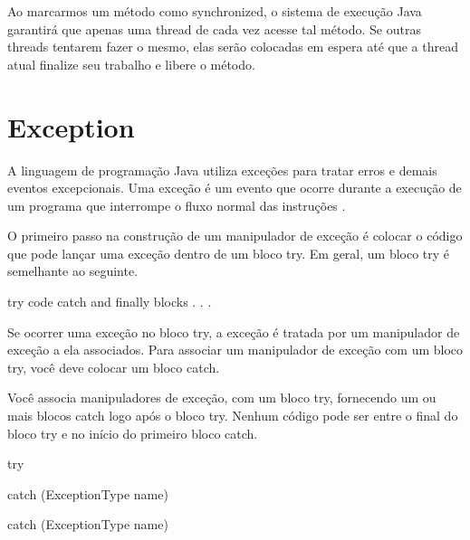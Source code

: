Ao marcarmos um método como synchronized, o sistema de execução Java garantirá que apenas uma thread de cada vez acesse tal método. Se outras threads tentarem fazer o mesmo, elas serão colocadas em espera até que a thread atual finalize seu trabalho e libere o método.

\section{Exception}

A linguagem de programação Java utiliza exceções para tratar erros e demais eventos excepcionais. Uma exceção é um evento que ocorre durante a execução de um programa que interrompe o fluxo normal das instruções \cite{except}.

O primeiro passo na construção de um manipulador de exceção é colocar o código que pode lançar uma exceção dentro de um bloco try. Em geral, um bloco try é semelhante ao seguinte.

try {
    code
}
catch and finally blocks . . .

Se ocorrer uma exceção no bloco try, a exceção é tratada por um manipulador de exceção a ela associados. Para associar um manipulador de exceção com um bloco try, você deve colocar um bloco catch.

Você associa manipuladores de exceção, com um bloco try, fornecendo um ou mais blocos catch logo após o bloco try. Nenhum código pode ser entre o final do bloco try e no início do primeiro bloco catch.

try {
     
} catch (ExceptionType name) {
     
} catch (ExceptionType name) {
     
}  



